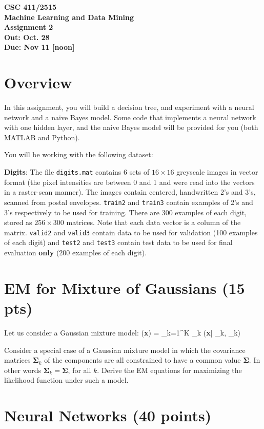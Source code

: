 \documentclass[12pt]{article}
\def\beqa#1\eeqa{\begin{eqnarray}#1\end{eqnarray}}
\newcommand{\bmu}{{\boldsymbol{\mu}}}
\newcommand{\bSigma}{{\boldsymbol{\Sigma}}}
\newcommand{\bx}{{\bf{x}}}
\begin{document}
\begin{center}
{\bf CSC 411/2515}\\
{\bf Machine Learning and Data Mining}\\
{\large \bf Assignment 2}\\
{\bf Out:  Oct. 28}\\
{\bf Due:  Nov 11 [noon]}
\end{center}

\section*{Overview}

In this assignment, you will build a decision tree, and experiment with a
neural network and a naive Bayes model. Some code that implements a neural
network with one hidden layer, and the naive Bayes model will be provided for you (both MATLAB and Python).

You will be working with the following dataset:

{\bf Digits}: The file {\tt digits.mat} contains 6 sets of $16 \times 16$
greyscale images in vector format (the pixel intensities are between 0 and 1 and
were read into the vectors in a raster-scan manner). The images contain
centered, handwritten 2's and 3's, scanned from postal envelopes. {\tt train2}
and {\tt train3} contain examples of 2's and 3's respectively to be used for
training. There are 300 examples of each digit, stored as $256 \times 300$
matrices. Note that each data vector is a column of the matrix. {\tt valid2} and {\tt valid3} contain data to be used for validation
(100 examples of each digit) and {\tt test2} and {\tt test3} contain test data
to be used for final evaluation {\bf only} (200 examples of each digit).

\section{EM for Mixture of Gaussians (15 pts) }

Let us consider a Gaussian mixture model:
\beqa
 p(\bx) = \sum_{k=1}^K \pi_k {}(\bx | \bmu_k, \bSigma_k)
\eeqa

Consider a special case of a Gaussian mixture model in which the covariance matrices
$\bSigma_k$ of the components are all constrained to have a common value $\bSigma$. 
In other words $\bSigma_k = \bSigma$, for all $k$. 
Derive
the EM equations for maximizing the likelihood function under such a model.


\section{Neural Networks (40 points)}
\end{document}

